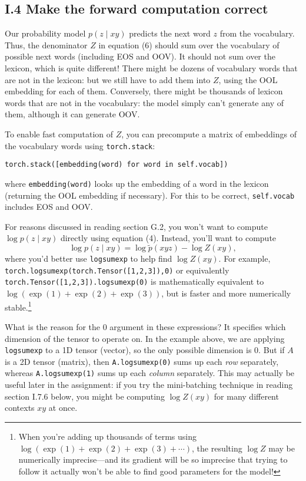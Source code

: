\subsection*{I.4 Make the forward computation correct}

Our probability model $p(z \mid xy)$ predicts the next word $z$ from the vocabulary. Thus, the denominator $Z$ in equation (6) should sum over the vocabulary of possible next words (including EOS and OOV). It should not sum over the lexicon, which is quite different! There might be dozens of vocabulary words that are not in the lexicon: but we still have to add them into $Z$, using the OOL embedding for each of them. Conversely, there might be thousands of lexicon words that are not in the vocabulary: the model simply can’t generate any of them, although it can generate OOV.

To enable fast computation of $Z$, you can precompute a matrix of embeddings of the vocabulary words using \texttt{torch.stack}:
\begin{verbatim}
torch.stack([embedding(word) for word in self.vocab])
\end{verbatim}
where \texttt{embedding(word)} looks up the embedding of a word in the lexicon (returning the OOL embedding if necessary). For this to be correct, \texttt{self.vocab} includes EOS and OOV.

For reasons discussed in reading section G.2, you won’t want to compute $\log p(z \mid xy)$ directly using equation (4). Instead, you’ll want to compute 
\[
\log p(z \mid xy) = \log \tilde{p}(xyz) - \log Z(xy),
\]
where you’d better use \texttt{logsumexp} to help find $\log Z(xy)$. For example, \texttt{torch.logsumexp(torch.Tensor([1,2,3]),0)} or equivalently \texttt{torch.Tensor([1,2,3]).logsumexp(0)} is mathematically equivalent to $\log(\exp(1)+\exp(2)+\exp(3))$, but is faster and more numerically stable.\footnote{When you’re adding up thousands of terms using $\log(\exp(1)+\exp(2)+\exp(3)+\cdots)$, the resulting $\log Z$ may be numerically imprecise—and its gradient will be so imprecise that trying to follow it actually won’t be able to find good parameters for the model!}

What is the reason for the $0$ argument in these expressions? It specifies which dimension of the tensor to operate on. In the example above, we are applying \texttt{logsumexp} to a 1D tensor (vector), so the only possible dimension is 0. But if $A$ is a 2D tensor (matrix), then \texttt{A.logsumexp(0)} sums up each \textit{row} separately, whereas \texttt{A.logsumexp(1)} sums up each \textit{column} separately. This may actually be useful later in the assignment: if you try the mini-batching technique in reading section I.7.6 below, you might be computing $\log Z(xy)$ for many different contexts $xy$ at once.

